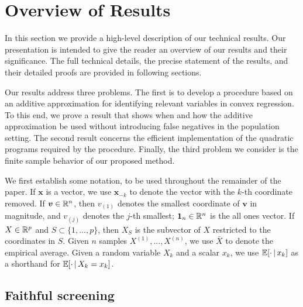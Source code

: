 \def\x{\mathbf{x}}

\section{Overview of Results}

In this section we provide a high-level description of our technical
results.  Our presentation is intended to give the reader
an overview of our results and their significance.  The 
full technical details, the precise statement of the results,
and their detailed proofs are provided in following sections.

Our results address three problems.  The first is to develop
a procedure based on an additive approximation for identifying
relevant variables in convex regression.  To this end,
we prove a result that shows when and how the additive approximation
be used without introducing false negatives in the population setting.  The
second result concerns the efficient implementation of
the quadratic programs required by the procedure.  
Finally, the third problem we consider is the finite sample
behavior of our proposed method.  

We first establish some notation, to be used throughout the remainder 
of the paper.
If $\mathbf{x}$ is a vector, we use $\mathbf{x}_{-k}$ to denote the
vector with the $k$-th coordinate removed. If $\mbox{\boldmath $v$} \in {\mathbb R}^n$, then
$v_{(1)}$ denotes the smallest coordinate of $\mathbf{v}$ in
magnitude, and $v_{(j)}$ denotes the $j$-th smallest; $\mbox{\boldmath $1$}_n \in {\mathbb R}^n$
is the all ones vector. If $X \in {\mathbb R}^p$ and $S \subset
\{1,...,p\}$, then $X_S$ is the subvector of $X$ restricted to
the coordinates in $S$. Given $n$ samples $X^{(1)},...,X^{(n)}$, we use
$\bar{X}$ to denote the empirical average. Given a random variable
$X_k$ and a scalar $x_k$, we use ${\mathbb E}[\cdot {\,|\,} x_k]$ as a shorthand
for ${\mathbb E}[ \cdot {\,|\,} X_k = x_k]$.


\subsection{Faithful screening}

